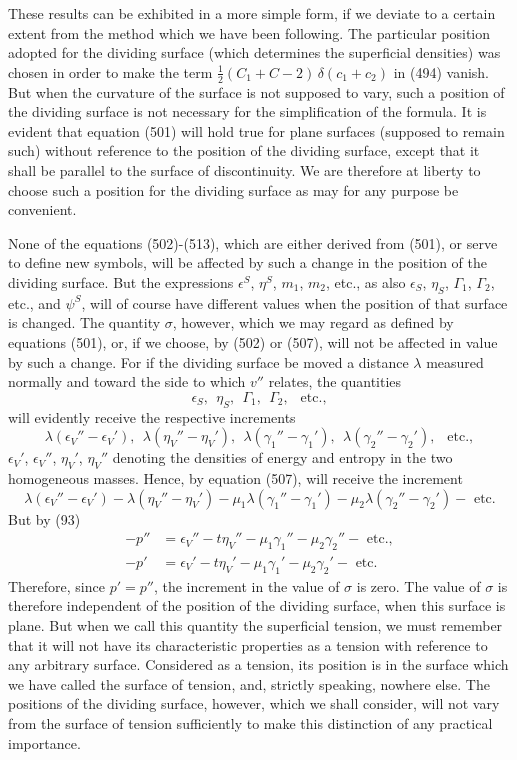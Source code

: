 \documentclass[12pt]{memoir}
\newcommand{\dd}{\delta}
\begin{document}
{These results can be exhibited in a more simple form, if we deviate to a certain extent from the method which we have been following. The particular position adopted for the dividing surface (which determines the superficial densities) was chosen in order to make the term  $\tfrac{1}{2}(C_1+C-2)\, \dd (c_1 +c_2)$ in (494) vanish. But when the curvature of the surface is not supposed to vary, such a position of the dividing surface is not necessary for the simplification of the formula. It is evident that equation (501) will hold true for plane surfaces (supposed to remain such) without reference to the position of the dividing surface, except that it shall be parallel to the surface of discontinuity. We are therefore at liberty to choose such a position for the dividing surface as may for any purpose be convenient.


None of the equations (502)-(513), which are either derived from (501), or serve to define new symbols, will be affected by such a change in the position of the dividing surface. But the expressions $\epsilon^S$, $\eta^S$, $m_1$, $m_2$, etc., as also $\epsilon_S$, $\eta_S$, $\Gamma_1$, $\Gamma_2$, etc., and $\psi^S$, will of course have different values when the position of that surface is changed. The quantity $\sigma$, however, which we may regard as defined by equations (501), or, if we choose, by (502) or (507), will not be affected in value by such a change. For if the dividing surface be moved a distance $\lambda$ measured normally and toward the side to which $v''$ relates, the quantities
$$\epsilon_S, \ \ \eta_S, \ \ \Gamma_1, \ \ \Gamma_2, \ \ \text{ etc.},$$
will evidently receive the respective increments
$$\lambda(\epsilon_{V}''-\epsilon_{V}'), \ \ \lambda(\eta_{V}''-\eta_{V}'), \ \ \lambda(\gamma_1''-\gamma_1'), \ \ \lambda(\gamma_2''-\gamma_2'), \ \  \text{ etc.}, $$
$\epsilon_{V}'$, $\epsilon_{V}''$, $\eta_{V}'$, $\eta_{V}''$ denoting the densities of energy and entropy in the two homogeneous masses. Hence, by equation (507),  will receive the increment
$$ \lambda(\epsilon_{V}''-\epsilon_{V}') - \lambda(\eta_{V}''-\eta_{V}')-\mu_1 \lambda(\gamma_1''-\gamma_1')-\mu_2 \lambda(\gamma_2''-\gamma_2') - \text{ etc.}$$
But by (93)
\begin{align*}
-p'' &= \epsilon_{V}'' - t\eta_V'' - \mu_1 \gamma_1'' - \mu_2 \gamma_2''  - \text{ etc.}, \\
-p' &= \epsilon_{V}' - t\eta_V' - \mu_1 \gamma_1' - \mu_2 \gamma_2'  - \text{ etc.}\end{align*}
Therefore, since $p'=p''$, the increment in the value of $\sigma$ is zero. The value of $\sigma$ is therefore independent of the position of the dividing surface, when this surface is plane. But when we call this quantity the superficial tension, we must remember that it will not have its characteristic properties as a tension with reference to any arbitrary surface. Considered as a tension, its position is in the surface which we have called the surface of tension, and, strictly speaking, nowhere else. The positions of the dividing surface, however, which we shall consider, will not vary from the surface of tension sufficiently to make this distinction of any practical importance.


}
\end{document}
